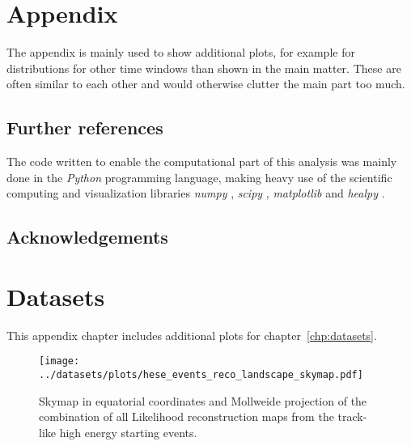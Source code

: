 \chapter{Appendix}
The appendix is mainly used to show additional plots, for example for distributions for other time windows than shown in the main matter.
These are often similar to each other and would otherwise clutter the main part too much.

\section{Further references}
The code written to enable the computational part of this analysis was mainly done in the \emph{Python} programming language, making heavy use of the scientific computing and visualization libraries \emph{numpy} \cite{numpy}, \emph{scipy} \cite{scipy}, \emph{matplotlib} \cite{matplotlib} and \emph{healpy} \cite{Gorski:2004by}.

\section{Acknowledgements}


\chapter{Datasets}
This appendix chapter includes additional plots for chapter~\ref{chp:datasets}.

\begin{figure}[htbp]
  \centering
  \texttt{[image: ../datasets/plots/hese\_events\_reco\_landscape\_skymap.pdf]}
  \caption[Combined Likelihood skymap of the 22 HESEs]{
    Skymap in equatorial coordinates and Mollweide projection of the combination of all Likelihood reconstruction maps from the track-like high energy starting events.
  }
  \label{fig:hese_events_reco_landscape_skymap}
\end{figure}
